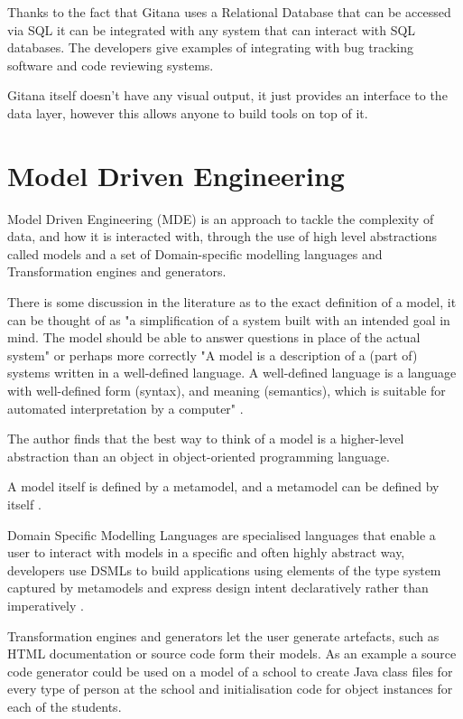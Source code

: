 \documentclass[11pt]{book}
\begin{document}
Thanks to the fact that Gitana uses a Relational Database that can be accessed via SQL it can be integrated with any system that can interact with SQL databases. The developers give examples of integrating with bug tracking software and code reviewing systems.

Gitana itself doesn't have any visual output, it just provides an interface to the data layer, however this allows anyone to build tools on top of it.

\section{Model Driven Engineering}
Model Driven Engineering (MDE) is an approach to tackle the complexity of data, and how it is interacted with, through the use of high level abstractions called models \cite{modeldrivenengineering} and a set of Domain-specific modelling languages and Transformation engines and generators. 

There is some discussion in the literature \cite{basictheorymde} as to the exact definition of a model, it can be thought of as "a simplification of a system built with an intended goal in mind. The model should be able to answer questions in place of the actual system" \cite{precisedefinitionmda} or perhaps more correctly "A model is a description of a (part of) systems written in a well-defined language. A well-defined language is a language with well-defined form (syntax), and meaning (semantics), which is suitable for automated interpretation by a computer" \cite{mdaexplained}.

The author finds that the best way to think of a model is a higher-level abstraction than an object in object-oriented programming language.

A model itself is defined by a metamodel, and a metamodel can be defined by itself \cite{metamodelling}. 

Domain Specific Modelling Languages are specialised languages that enable a user to interact with models in a specific and often highly abstract way, developers use DSMLs to build applications using elements of the type system captured by metamodels and express design intent declaratively rather than imperatively \cite{modeldrivenengineering}. %

Transformation engines and generators let the user generate artefacts, such as HTML documentation or source code form their models. As an example a source code generator could be used on a model of a school to create Java class files for every type of person at the school and initialisation code for object instances for each of the students.
\end{document}
